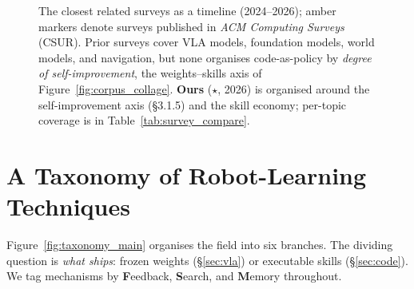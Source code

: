 \documentclass[acmsmall,review,anonymous]{acmart}
\begin{document}
\begin{figure}[t]
{}
\caption{The closest related surveys as a timeline (2024--2026);
\textcolor{secD!55!black}{amber} markers denote surveys published in \emph{ACM Computing
Surveys} (CSUR). Prior surveys cover VLA models, foundation models, world models, and navigation,
but none organises code-as-policy by \emph{degree of self-improvement}, the weights--skills axis of
Figure~\ref{fig:corpus_collage}. \textbf{Ours}
($\star$, 2026) is organised around the self-improvement axis (\S3.1.5) and the skill economy;
per-topic coverage is in Table~\ref{tab:survey_compare}.}
\label{fig:surveys}
\end{figure}
 \FloatBarrier
\section{A Taxonomy of Robot-Learning Techniques}
\label{sec:taxonomy}

Figure~\ref{fig:taxonomy_main} organises the field into six branches. The dividing
question is \emph{what ships}: frozen weights (\S\ref{sec:vla}) or executable skills
(\S\ref{sec:code}). We tag mechanisms by \textbf{F}eedback, \textbf{S}earch, and
\textbf{M}emory throughout.
\end{document}
